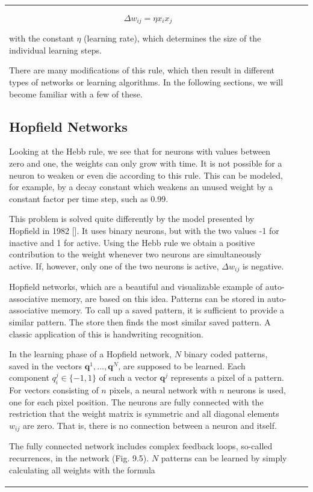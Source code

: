 \documentclass[10pt]{book}
\begin{document}
\begin{center}
\begin{tabular}{|l|l|l|}
$$
\Delta w_{i j}=\eta x_{i} x_{j}
$$

with the constant $\eta$ (learning rate), which determines the size of the individual learning steps.

There are many modifications of this rule, which then result in different types of networks or learning algorithms. In the following sections, we will become familiar with a few of these.

\subsection{Hopfield Networks}
Looking at the Hebb rule, we see that for neurons with values between zero and one, the weights can only grow with time. It is not possible for a neuron to weaken or even die according to this rule. This can be modeled, for example, by a decay constant which weakens an unused weight by a constant factor per time step, such as 0.99.

This problem is solved quite differently by the model presented by Hopfield in 1982 [\cite{hop82}]. It uses binary neurons, but with the two values -1 for inactive and 1 for active. Using the Hebb rule we obtain a positive contribution to the weight whenever two neurons are simultaneously active. If, however, only one of the two neurons is active, $\Delta w_{i j}$ is negative.

Hopfield networks, which are a beautiful and visualizable example of auto-associative memory, are based on this idea. Patterns can be stored in auto-associative memory. To call up a saved pattern, it is sufficient to provide a similar pattern. The store then finds the most similar saved pattern. A classic application of this is handwriting recognition.

In the learning phase of a Hopfield network, $N$ binary coded patterns, saved in the vectors $\boldsymbol{q}^{1}, \ldots, \boldsymbol{q}^{N}$, are supposed to be learned. Each component $q_{i}^{j} \in\{-1,1\}$ of such a vector $\boldsymbol{q}^{j}$ represents a pixel of a pattern. For vectors consisting of $n$ pixels, a neural network with $n$ neurons is used, one for each pixel position. The neurons are fully connected with the restriction that the weight matrix is symmetric and all diagonal elements $w_{i j}$ are zero. That is, there is no connection between a neuron and itself.

The fully connected network includes complex feedback loops, so-called recurrences, in the network (Fig. 9.5).
$N$ patterns can be learned by simply calculating all weights with the formula


\end{tabular}
\end{center}
\end{document}
